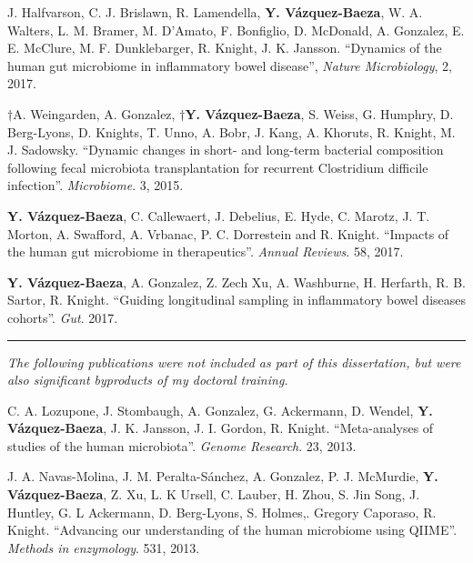 \begin{frontmatter}
\begin{vitapage}
\begin{publications}
    \item J. Halfvarson, C. J. Brislawn, R. Lamendella, \textbf{Y. V\'azquez-Baeza}, W. A. Walters, L. M. Bramer, M. D'Amato, F. Bonfiglio, D. McDonald, A. Gonzalez, E. E. McClure, M. F. Dunklebarger, R. Knight, J. K. Jansson. ``Dynamics of the human gut microbiome in inflammatory bowel disease'', \emph{Nature Microbiology}, 2, 2017.
  
    \item $\dagger$A. Weingarden, A. Gonzalez, \textbf{$\dagger$Y.  
        V\'azquez-Baeza}, S. Weiss, G. Humphry, D. Berg-Lyons, D. Knights, T.  
        Unno, A. Bobr, J. Kang, A. Khoruts, R. Knight, M. J. Sadowsky.  
        ``Dynamic changes in short- and long-term bacterial composition 
        following fecal microbiota transplantation for recurrent Clostridium 
        difficile infection''. \emph{Microbiome}. 3, 2015.

    \item \textbf{Y. V\'azquez-Baeza}, C. Callewaert, J. Debelius, E. Hyde, C. Marotz, J. T. Morton, A. Swafford, A. Vrbanac, P. C. Dorrestein and R. Knight. ``Impacts of the human gut microbiome in therapeutics''. \emph{Annual Reviews}. 58, 2017.

    \item \textbf{Y. V\'azquez-Baeza}, A. Gonzalez, Z. Zech Xu, A. Washburne, 
        H. Herfarth, R. B. Sartor, R. Knight. ``Guiding longitudinal sampling 
        in inflammatory bowel diseases cohorts''. \emph{Gut}. 2017.

    \item \noindent\rule[0.5ex]{\linewidth}{0.5pt}

    \textsl{The following publications were not included as part of this dissertation, but were also significant byproducts of my doctoral training.}

    \item C. A. Lozupone, J. Stombaugh, A. Gonzalez, G. Ackermann, D. Wendel, \textbf{Y. V\'azquez-Baeza}, J. K. Jansson, J. I. Gordon, R. Knight. ``Meta-analyses of studies of the human microbiota''. \emph{Genome Research}. 23, 2013.

    \item J. A. Navas-Molina, J. M. Peralta-S\'anchez, A. Gonzalez, P. J.  
        McMurdie, \textbf{Y. V\'azquez-Baeza}, Z. Xu, L. K Ursell, C. Lauber, 
        H. Zhou, S. Jin Song, J. Huntley, G. L Ackermann, D. Berg-Lyons, S.  
        Holmes,. Gregory Caporaso, R. Knight. ``Advancing our understanding of 
        the human microbiome using QIIME''. \emph{Methods in enzymology}. 531, 
        2013.


\end{publications}
\end{vitapage}
\end{frontmatter}

